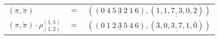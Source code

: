 \begin{example}\label{example:KXXIMDRH}
  \hfill
  \begin{\position}
    \begin{tabular}{lll}
      $(\pi,\breve\pi)$ & $=$ & $(({0}~\underline{{4}~{5}~{3}~{2}~{1}}~{6}),(\overline{1},\underline{1,7,3,0},\overline{2}))$ \\
      $(\pi,\breve\pi) \cdot \rho^{(1,5)}_{(1,2)}$ & $=$ & $(({0}~\underline{{1}~{2}~{3}~{5}~{4}}~{6}),(\overline{3},\underline{0,3,7,1},\overline{0}))$ \\
    \end{tabular}
  \end{\position}
\end{example}